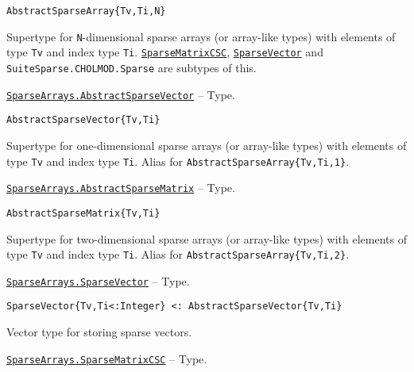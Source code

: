 \begin{adjustwidth}{2em}{0pt}


\begin{verbatim}
AbstractSparseArray{Tv,Ti,N}
\end{verbatim}

Supertype for \texttt{N}-dimensional sparse arrays (or array-like types) with elements of type \texttt{Tv} and index type \texttt{Ti}. \hyperlink{15099699527958384292}{\texttt{SparseMatrixCSC}}, \hyperlink{17594730109701296640}{\texttt{SparseVector}} and \texttt{SuiteSparse.CHOLMOD.Sparse} are subtypes of this.



\end{adjustwidth}
\hypertarget{7311510774978482969}{}
\hyperlink{7311510774978482969}{\texttt{SparseArrays.AbstractSparseVector}}  -- {Type.}

\begin{adjustwidth}{2em}{0pt}


\begin{verbatim}
AbstractSparseVector{Tv,Ti}
\end{verbatim}

Supertype for one-dimensional sparse arrays (or array-like types) with elements of type \texttt{Tv} and index type \texttt{Ti}. Alias for \texttt{AbstractSparseArray\{Tv,Ti,1\}}.



\end{adjustwidth}
\hypertarget{7507379576530105001}{}
\hyperlink{7507379576530105001}{\texttt{SparseArrays.AbstractSparseMatrix}}  -- {Type.}

\begin{adjustwidth}{2em}{0pt}


\begin{verbatim}
AbstractSparseMatrix{Tv,Ti}
\end{verbatim}

Supertype for two-dimensional sparse arrays (or array-like types) with elements of type \texttt{Tv} and index type \texttt{Ti}. Alias for \texttt{AbstractSparseArray\{Tv,Ti,2\}}.



\end{adjustwidth}
\hypertarget{17594730109701296640}{}
\hyperlink{17594730109701296640}{\texttt{SparseArrays.SparseVector}}  -- {Type.}

\begin{adjustwidth}{2em}{0pt}


\begin{verbatim}
SparseVector{Tv,Ti<:Integer} <: AbstractSparseVector{Tv,Ti}
\end{verbatim}

Vector type for storing sparse vectors.



\end{adjustwidth}
\hypertarget{15099699527958384292}{}
\hyperlink{15099699527958384292}{\texttt{SparseArrays.SparseMatrixCSC}}  -- {Type.}

